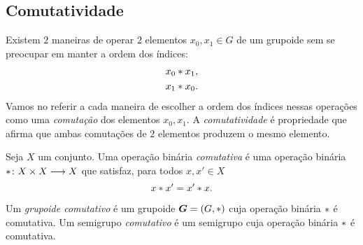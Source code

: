 \begin{comment}
Essa proposição diz que podemos colocar os parênteses como quisermos que o resultado será o mesmo, pois
	\begin{equation*}
	\bigopb_{j \in [p]}\left(\bigopb_{i \in [k_j]} x_{i + k_0 + \cdots + k_{j-1}}\right) = \left(\bigopb_{i \in [k_{p-1}]} x_{i + k_0 + \cdots + k_{p-2}}\right) \opb \cdots \opb \left(\bigopb_{i \in [k_0]} x_i\right)
	\end{equation*}
e a partição $(k_j)_{j \in [p]}$ determina essa separação.

\begin{notation}
Por causa da associatividade generalizada, denota-se essa operação por
	\begin{equation*}
	x_{n-1} \opb \cdots \opb x_0 := \bigopb_{i \in [n]} x_i = (x_{n-1} \opb ( \cdots (x_1 \opb x_0))).
	\end{equation*}
\end{notation}
\end{comment}

\subsection{Comutatividade}

Existem $2$ maneiras de operar $2$ elementos $x_0, x_1 \in G$ de um grupoide sem se preocupar em manter a ordem dos índices:
	\begin{align*}
	& x_0 \ast x_1, \\
	& x_1 \ast x_0.
	\end{align*}
Vamos no referir a cada maneira de escolher a ordem dos índices nessas operações como uma \textit{comutação} dos elementos $x_0, x_1$. A \textit{comutatividade} é propriedade que afirma que ambas comutações de $2$ elementos produzem o mesmo elemento.%

\begin{definition}[Comutatividade]
Seja $X$ um conjunto. Uma operação binária \emph{comutativa} é uma operação binária $\ast\colon \allowbreak X \times X \longrightarrow X$ que satisfaz, para todos $x,x' \in X$
		\begin{equation*}
		x \ast x' = x' \ast x.
		\end{equation*}
\end{definition}

\begin{definition}
Um \emph{grupoide comutativo} é um grupoide $\bm G=(G,\ast)$ cuja operação binária $\ast$ é comutativa. Um semigrupo \emph{comutativo} é um semigrupo cuja operação binária $\ast$ é comutativa.
\end{definition}

